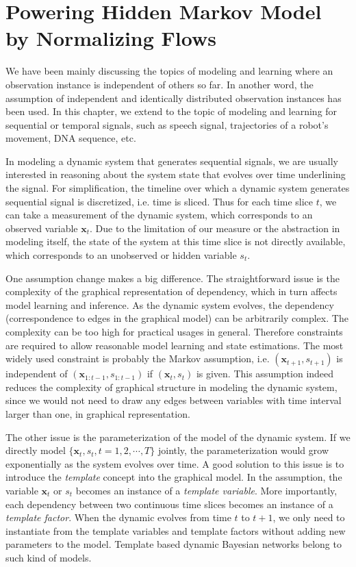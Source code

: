 \chapter{Powering Hidden Markov Model by Normalizing Flows}
We have been mainly discussing the topics of modeling and learning where an observation instance is independent of others so far. In another word, the assumption of independent and identically distributed observation instances has been used. In this chapter, we extend to the topic of modeling and learning for sequential or temporal signals, such as speech signal, trajectories of a robot's movement, DNA sequence, etc.

In modeling a dynamic system that generates sequential signals, we are usually interested in reasoning about the system state that evolves over time underlining the signal. For simplification, the timeline over which a dynamic system generates sequential signal is discretized, i.e. time is sliced. Thus for each time slice $t$, we can take a measurement of the dynamic system, which corresponds to an observed variable $\bm{x}_t$. Due to the limitation of our measure or the abstraction in modeling itself, the state of the system at this time slice is not directly available, which corresponds to an unobserved or hidden variable $s_t$.

One assumption change makes a big difference. The straightforward issue is the complexity of the graphical representation of dependency, which in turn affects model learning and inference. As the dynamic system evolves, the dependency (correspondence to edges in the graphical model) can be arbitrarily complex. The complexity can be too high for practical usages in general. Therefore constraints are required to allow reasonable model learning and state estimations.
The most widely used constraint is probably the Markov assumption, i.e. $(\bm{x}_{t+1}, {s}_{t+1})$ is independent of $(\bm{x}_{1:t-1}, {s}_{1:t-1})$ if $(\bm{x}_{t}, {s}_{t})$ is given. This assumption indeed reduces the complexity of graphical structure in modeling the dynamic system, since we would not need to draw any edges between variables with time interval larger than one, in graphical representation.

The other issue is the parameterization of the model of the dynamic system. If we directly model $\{\bm{x}_t, {s}_t, t=1, 2, \cdots, T\}$ jointly, the parameterization would grow exponentially as the system evolves over time. A good solution to this issue is to introduce the \textit{template} concept into the graphical model. In the assumption, the variable $\bm{x}_t$ or $s_t$ becomes an instance of a \textit{template variable}. More importantly, each dependency between two continuous time slices becomes an instance of a \textit{template factor}. When the dynamic evolves from time $t$ to $t+1$, we only need to instantiate from the template variables and template factors without adding new parameters to the model. Template based dynamic Bayesian networks belong to such kind of models.

